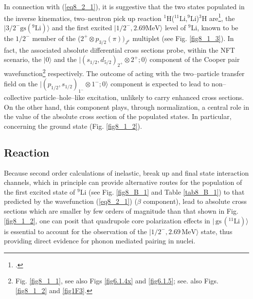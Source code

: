  In connection with  (\ref{eq8_2_1}), it is suggestive that the two states populated in the  inverse kinematics, two--neutron pick up reaction $^1$H($^{11}$Li,$^9$Li)$^3$H are\footnote{\cite{Tanihata:08}.}, the $|3/2^-\text{gs}(^9\text{Li})\rangle$ and the first excited $|1/2^-,2.69\text{MeV}\rangle$ level of $^9$Li,  known to be the $1/2^-$ member of the ($2^+\otimes p_{3/2}(\pi))_{J^\pi}$ multiplet (see Fig. \ref{fig8_1_3}). In fact, the associated absolute differential cross sections probe, within the NFT scenario, the $|0\rangle$  and the $|(s_{1/2},d_{5/2})_{2^+}\otimes 2^+;0\rangle$ component of the Cooper pair wavefunction\footnote{Fig. \ref{fig8_1_1}, see also Figs \ref{fig6.1.4x} and \ref{fig6.1.5}; see. also Figs. \ref{fig8_1_2} and \ref{fig1F3}.} respectively. The outcome of acting with the two--particle transfer field on the $|(p_{1/2},s_{1/2})_{1^-}\otimes 1^-;0\rangle$ component is expected to lead to non--collective particle--hole--like excitation, unlikely to carry enhanced cross sections. On the other hand, this component plays, through normalization, a central role in the value of the absolute cross section of the populated states. In particular, concerning the ground state (Fig. \ref{fig8_1_2}).  
 
 
 
\subsection{Reaction}\label{C6S1.2}
Because second order calculations of inelastic, break up and final state interaction channels, which in principle can provide alternative routes for the population of the first excited state of $^9$Li (see Fig. \ref{fig8_B_1} and Table \ref{tab8_B_1}) to that predicted by the wavefunction (\ref{eq8_2_1})  ($\beta$ component), lead to absolute cross sections which are smaller by few orders of magnitude than that shown in Fig. \ref{fig8_1_2}, one can posit that quadrupole core polarization effects in $|\,\text{gs}\,(^{11}\text{Li})\rangle$ is essential to account for the observation of the $|1/2^-,2.69\,\text{MeV}\rangle$ state, thus providing
 direct evidence for phonon mediated pairing in nuclei. 
 
